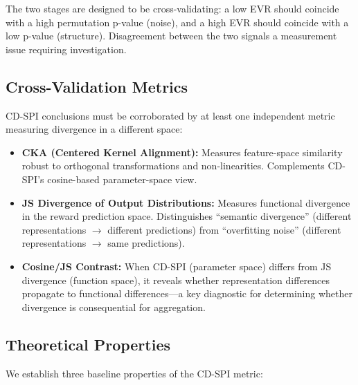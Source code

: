 \documentclass{article}
\begin{document}
The two stages are designed to be cross-validating: a low EVR should coincide with a high permutation p-value (noise), and a high EVR should coincide with a low p-value (structure).
Disagreement between the two signals a measurement issue requiring investigation.

\subsection{Cross-Validation Metrics}

CD-SPI conclusions must be corroborated by at least one independent metric measuring divergence in a different space:

\begin{itemize}
    \item \textbf{CKA (Centered Kernel Alignment):} Measures feature-space similarity robust to orthogonal transformations and non-linearities. Complements CD-SPI's cosine-based parameter-space view.
    \item \textbf{JS Divergence of Output Distributions:} Measures functional divergence in the reward prediction space. Distinguishes ``semantic divergence'' (different representations $\rightarrow$ different predictions) from ``overfitting noise'' (different representations $\rightarrow$ same predictions).
    \item \textbf{Cosine/JS Contrast:} When CD-SPI (parameter space) differs from JS divergence (function space), it reveals whether representation differences propagate to functional differences---a key diagnostic for determining whether divergence is consequential for aggregation.
\end{itemize}

\subsection{Theoretical Properties}

We establish three baseline properties of the CD-SPI metric:
\end{document}
